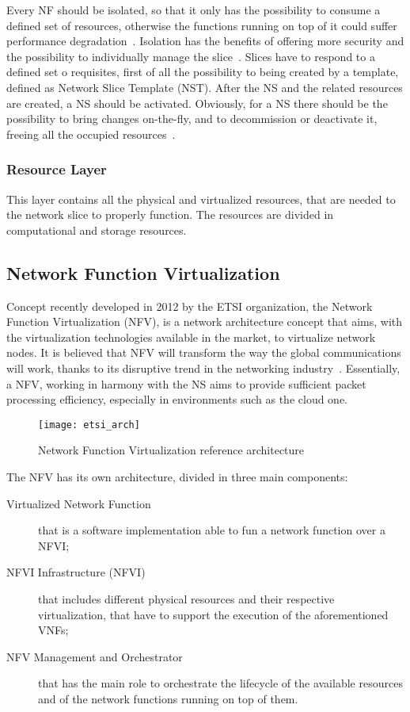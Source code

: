 \vspace{0.5cm}

\noindent Every NF should be isolated, so that it only has the possibility to
consume a defined set of resources, otherwise the functions running on top of it
could suffer performance degradation~\cite{richart2016resource}. Isolation has
the benefits of offering more security and the possibility to individually
manage the slice~\cite{ordonez2017network}. Slices have to respond to a defined
set o requisites, first of all the possibility to being created by a template,
defined as Network Slice Template (NST). After the NS and the related resources
are created, a NS should be activated. Obviously, for a NS there should be the
possibility to bring changes on-the-fly, and to decommission or deactivate it,
freeing all the occupied resources~\cite{slice20183gpp}.

\subsubsection{Resource Layer}
This layer contains all the physical and virtualized resources, that are needed
to the network slice to properly function. The resources are divided in
computational and storage resources.

\subsection{Network Function Virtualization}
Concept recently developed in 2012 by the ETSI organization, the Network
Function Virtualization (NFV), is a network architecture concept that aims, with
the virtualization technologies available in the market, to virtualize network
nodes. It is believed that NFV will transform the way the global communications
will work, thanks to its disruptive trend in the networking
industry~\cite{gray2016network}. Essentially, a NFV, working in harmony with the
NS aims to provide sufficient packet processing efficiency, especially in
environments such as the cloud one.

\begin{figure}[t]
  \centering
  \texttt{[image: etsi\_arch]}
  \caption[Network Function Virtualization reference architecture]{Network
    Function Virtualization reference architecture~\cite{etsi2013gs}}
  \label{chap:background:img:etsi_arch}
\end{figure}

\noindent The NFV has its own architecture, divided in three main components:
\begin{description}
\item[Virtualized Network Function] that is a software implementation able to fun
  a network function over a NFVI;
\item[NFVI Infrastructure (NFVI)] that includes different physical resources
  and their respective virtualization, that have to support the execution of the
  aforementioned VNFs;
\item[NFV Management and Orchestrator] that has the main role to orchestrate the
  lifecycle of the available resources and of the network functions running on
  top of them.
\end{description}

